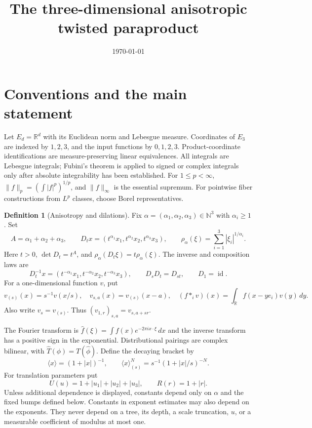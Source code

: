 \documentclass[12pt,reqno]{amsart}
\title[Anisotropic twisted paraproduct]{The three-dimensional anisotropic twisted paraproduct}
\date{\today}
\theoremstyle{plain}
\theoremstyle{definition}
\newtheorem{definition}[theorem]{Definition}
\theoremstyle{remark}
\numberwithin{equation}{section}
\newcommand{\R}{\mathbb R}
\newcommand{\N}{\mathbb N}
\newcommand{\dd}{\,d}
\newcommand{\br}[1]{\langle #1\rangle}
\begin{document}
\maketitle
\tableofcontents

\section{Conventions and the main statement}

Let $E_d=\R^d$ with its Euclidean norm and Lebesgue measure.
Coordinates of $E_3$ are indexed by $1,2,3$, and the input functions
by $0,1,2,3$.
Product-coordinate identifications are measure-preserving linear
equivalences. All integrals are Lebesgue integrals; Fubini's theorem
is applied to signed or complex integrals only after absolute
integrability has been established.
For $1\le p<\infty$, $\|f\|_p=(\int |f|^p)^{1/p}$, and
$\|f\|_\infty$ is the essential supremum.
For pointwise fiber constructions from $L^p$ classes, choose Borel
representatives.

\begin{definition}[Anisotropy and dilations]\label{def:anisotropy}
Fix $\alpha=(\alpha_1,\alpha_2,\alpha_3)\in\N^3$ with $\alpha_i\ge1$.
Set
\[
 A=\alpha_1+\alpha_2+\alpha_3,\qquad
 D_t x=(t^{\alpha_1}x_1,t^{\alpha_2}x_2,t^{\alpha_3}x_3),\qquad
 \rho_\alpha(\xi)=\sum_{i=1}^3|\xi_i|^{1/\alpha_i}.
\]
Here $t>0$, $\det D_t=t^A$, and
$\rho_\alpha(D_t\xi)=t\rho_\alpha(\xi)$.
The inverse and composition laws are
\[
 D_t^{-1}x=(t^{-\alpha_1}x_1,t^{-\alpha_2}x_2,t^{-\alpha_3}x_3),
 \qquad D_sD_t=D_{st},\qquad D_1=\operatorname{id}.
\]
For a one-dimensional function $v$, put
\[
 v_{(s)}(x)=s^{-1}v(x/s),\quad
 v_{s,a}(x)=v_{(s)}(x-a),\quad
 (f*_i v)(x)=\int_\R f(x-ye_i)v(y)\dd y.
\]
Also write $v_s=v_{(s)}$. Thus $(v_{1,r})_{s,a}=v_{s,a+sr}$.
\end{definition}

The Fourier transform is
$\widehat f(\xi)=\int f(x)e^{-2\pi i x\cdot\xi}\dd x$ and the inverse
transform has a positive sign in the exponential. Distributional
pairings are complex bilinear, with
$\widehat T(\phi)=T(\widehat\phi)$.
Define the decaying bracket by
\[
 \br{x}=(1+|x|)^{-1},\qquad
 \br{x}_{(s)}^N=s^{-1}(1+|x|/s)^{-N}.
\]
For translation parameters put
\[
 U(u)=1+|u_1|+|u_2|+|u_3|,\qquad R(r)=1+|r|.
\]
Unless additional dependence is displayed, constants depend only on
$\alpha$ and the fixed bumps defined below. Constants in exponent
estimates may also depend on the exponents. They never depend on a
tree, its depth, a scale truncation, $u$, or a measurable coefficient
of modulus at most one.
\end{document}
